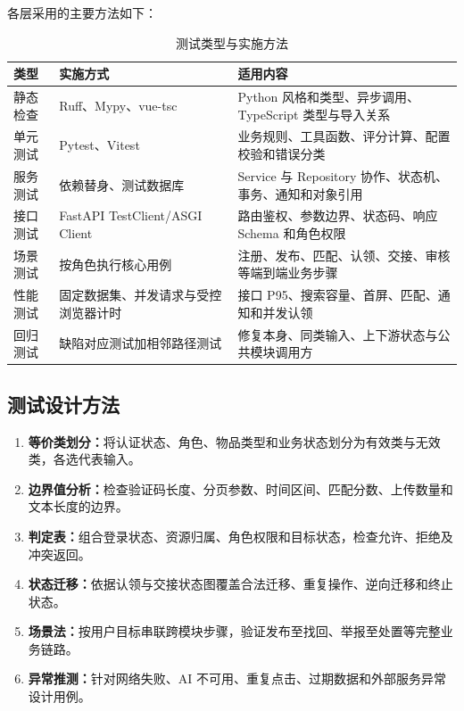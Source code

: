 各层采用的主要方法如下：

\begin{table}[H]
  \centering
  \caption{测试类型与实施方法}
  \begin{tabularx}{\textwidth}{L{2.5cm}L{3.5cm}Y}
    \toprule
    类型 & 实施方式 & 适用内容 \\
    \midrule
    静态检查 & Ruff、Mypy、vue-tsc & Python 风格和类型、异步调用、TypeScript 类型与导入关系 \\
    单元测试 & Pytest、Vitest & 业务规则、工具函数、评分计算、配置校验和错误分类 \\
    服务测试 & 依赖替身、测试数据库 & Service 与 Repository 协作、状态机、事务、通知和对象引用 \\
    接口测试 & FastAPI TestClient/ASGI Client & 路由鉴权、参数边界、状态码、响应 Schema 和角色权限 \\
    场景测试 & 按角色执行核心用例 & 注册、发布、匹配、认领、交接、审核等端到端业务步骤 \\
    性能测试 & 固定数据集、并发请求与受控浏览器计时 & 接口 P95、搜索容量、首屏、匹配、通知和并发认领 \\
    回归测试 & 缺陷对应测试加相邻路径测试 & 修复本身、同类输入、上下游状态与公共模块调用方 \\
    \bottomrule
  \end{tabularx}
\end{table}

\subsection{测试设计方法}

\begin{enumerate}
  \item \textbf{等价类划分：}将认证状态、角色、物品类型和业务状态划分为有效类与无效类，各选代表输入。
  \item \textbf{边界值分析：}检查验证码长度、分页参数、时间区间、匹配分数、上传数量和文本长度的边界。
  \item \textbf{判定表：}组合登录状态、资源归属、角色权限和目标状态，检查允许、拒绝及冲突返回。
  \item \textbf{状态迁移：}依据认领与交接状态图覆盖合法迁移、重复操作、逆向迁移和终止状态。
  \item \textbf{场景法：}按用户目标串联跨模块步骤，验证发布至找回、举报至处置等完整业务链路。
  \item \textbf{异常推测：}针对网络失败、AI 不可用、重复点击、过期数据和外部服务异常设计用例。
\end{enumerate}

